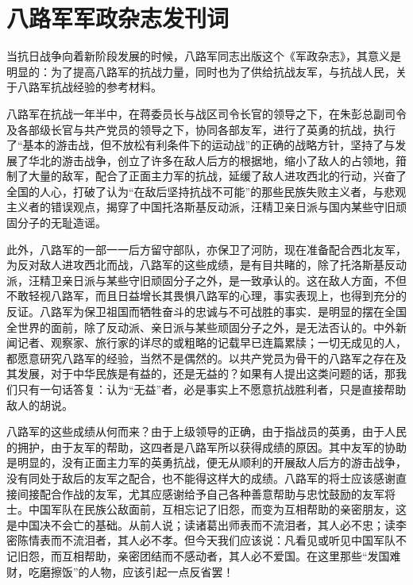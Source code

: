 \section[八路军军政杂志发刊词（一九三九年一月二日）]{八路军军政杂志发刊词}


当抗日战争向着新阶段发展的时候，八路军同志出版这个《军政杂志》，其意义是明显的：为了提高八路军的抗战力量，同时也为了供给抗战友军，与抗战人民，关于八路军抗战经验的参考材料。

八路军在抗战一年半中，在蒋委员长与战区司令长官的领导之下，在朱彭总副司令及各部级长官与共产党员的领导之下，协同各部友军，进行了英勇的抗战，执行了“基本的游击战，但不放松有利条件下的运动战”的正确的战略方针，坚持了与发展了华北的游击战争，创立了许多在敌人后方的根据地，缩小了敌人的占领地，箝制了大量的敌军，配合了正面主力军的抗战，延缓了敌人进攻西北的行动，兴奋了全国的人心，打破了认为“在敌后坚持抗战不可能”的那些民族失败主义者，与悲观主义者的错误观点，揭穿了中国托洛斯基反动派，汪精卫亲日派与国内某些守旧顽固分子的无耻造谣。

此外，八路军的一部一一后方留守部队，亦保卫了河防，现在准备配合西北友军，为反对敌人进攻西北而战，八路军的这些成绩，是有目共睹的，除了托洛斯基反动派，汪精卫亲日派与某些守旧顽固分子之外，是一致承认的。这在敌人方面，不但不敢轻视八路军，而且日益增长其畏惧八路军的心理，事实表现上，也得到充分的反证。八路军为保卫祖国而牺牲奋斗的忠诚与不可战胜的事实．是明显的摆在全国全世界的面前，除了反动派、亲日派与某些顽固分子之外，是无法否认的。中外新闻记者、观察家、旅行家的详尽的或粗略的记载早已连篇累牍；一切无成见的人，都愿意研究八路军的经验，当然不是偶然的。以共产党员为骨干的八路军之存在及其发展，对于中华民族是有益的，还是无益的？如果有人提出这类问题的话，那我们只有一句话答复：认为“无益”者，必是事实上不愿意抗战胜利者，只是直接帮助敌人的胡说。

八路军的这些成绩从何而来？由于上级领导的正确，由于指战员的英勇，由于人民的拥护，由于友军的帮助，这四者是八路军所以获得成绩的原因。其中友军的协助是明显的，没有正面主力军的英勇抗战，便无从顺利的开展敌人后方的游击战争，没有同处于敌后的友军之配合，也不能得这样大的成绩。八路军的将士应该感谢直接间接配合作战的友军，尤其应感谢给予自己各种善意帮助与忠忱鼓励的友军将士。中国军队在民族公敌面前，互相忘记了旧怨，而变为互相帮助的亲密朋友，这是中国决不会亡的基础。从前人说；读诸葛出师表而不流泪者，其人必不忠；读李密陈情表而不流泪者，其人必不孝。但今天我们应该说：凡看见或听见中国军队不记旧怨，而互相帮助，亲密团结而不感动者，其人必不爱国。在这里那些“发国难财，吃磨擦饭”的人物，应该引起一点反省罢！

